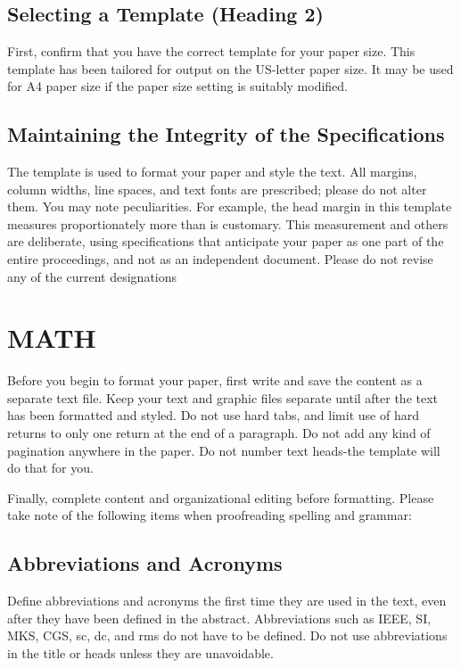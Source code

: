 \documentclass[letterpaper, 10 pt, conference]{ieeeconf}  %
\begin{document}
\section{}

\subsection{Selecting a Template (Heading 2)}

First, confirm that you have the correct template for your paper size. This template has been tailored for output on the US-letter paper size. 
It may be used for A4 paper size if the paper size setting is suitably modified.

\subsection{Maintaining the Integrity of the Specifications}

The template is used to format your paper and style the text. All margins, column widths, line spaces, and text fonts are prescribed; please do not alter them. You may note peculiarities. For example, the head margin in this template measures proportionately more than is customary. This measurement and others are deliberate, using specifications that anticipate your paper as one part of the entire proceedings, and not as an independent document. Please do not revise any of the current designations

\section{MATH}

Before you begin to format your paper, first write and save the content as a separate text file. Keep your text and graphic files separate until after the text has been formatted and styled. Do not use hard tabs, and limit use of hard returns to only one return at the end of a paragraph. Do not add any kind of pagination anywhere in the paper. Do not number text heads-the template will do that for you.

Finally, complete content and organizational editing before formatting. Please take note of the following items when proofreading spelling and grammar:

\subsection{Abbreviations and Acronyms} Define abbreviations and acronyms the first time they are used in the text, even after they have been defined in the abstract. Abbreviations such as IEEE, SI, MKS, CGS, sc, dc, and rms do not have to be defined. Do not use abbreviations in the title or heads unless they are unavoidable.
\end{document}
